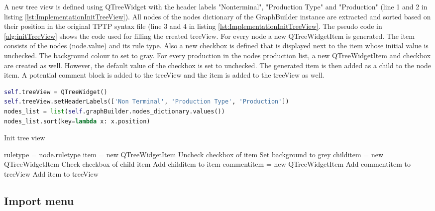 A new tree view is defined using QTreeWidget with the header labels "Nonterminal", "Production Type" and "Production" (line 1 and 2 in listing \ref{lst:ImplementationInitTreeView}).
All nodes of the nodes dictionary of the GraphBuilder instance are extracted and sorted based on their position in the original \ac{TPTP} syntax file (line 3 and 4 in listing \ref{lst:ImplementationInitTreeView}. 
The pseudo code in \ref{alg:initTreeView} shows the code used for filling the created treeView. For every node a new QTreeWidgetItem is generated. The item consists of the nodes (node.value) and its rule type. Also a new checkbox is defined that is displayed next to the item whose initial value is unchecked. The background colour to set to gray.
For every production in the nodes production list, a new QTreeWidgetItem and checkbox are created as well. However, the default value of the checkbox is set to unchecked. The generated item is then added as a child to the node item. A potential comment block is added to the treeView and the item is added to the treeView as well.

\begin{lstlisting}[language=Python, basicstyle=\scriptsize	,caption= Init Tree View,label= lst:ImplementationInitTreeView]
self.treeView = QTreeWidget()
self.treeView.setHeaderLabels(['Non Terminal', 'Production Type', 'Production'])
nodes_list = list(self.graphBuilder.nodes_dictionary.values())
nodes_list.sort(key=lambda x: x.position)
\end{lstlisting}

\begin{algorithm}[H]
\caption{Init tree view}
\label{alg:initTreeView}
\begin{algorithmic}[1] 
	\State rule\textunderscore type = node.rule\textunderscore type
	\State item = new QTreeWidgetItem
    \State Uncheck checkbox of item 
    \State Set background to grey
		\State child\textunderscore item = new QTreeWidgetItem
		\State Check checkbox of child item
		\State Add child\textunderscore item to item
	\EndFor    
		\State comment\textunderscore item = new QTreeWidgetItem
		\State Add comment\textunderscore item to treeView
	\EndIf
	\State Add item to treeView
\EndFor
\end{algorithmic}
\end{algorithm}

\subsection{Import menu}\label{sec:ImplementationGUIImportMenu}	
